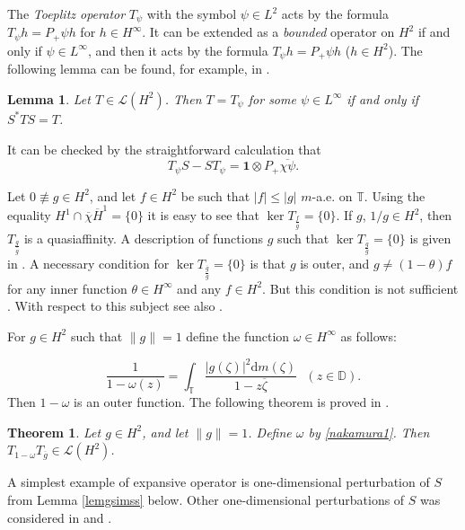 \documentclass[a4paper,oneside,11pt]{amsart}
\numberwithin{equation}{section}
\theoremstyle{plain}
\newtheorem{lemma}[theorem]{Lemma}
\newtheorem{theoremcite}{Theorem}
\theoremstyle{definition}
\begin{document}
The \emph{Toeplitz operator} $T_\psi$ with  the symbol $\psi\in L^2$ acts by the formula 
$T_\psi h=P_+\psi h$ for $h\in H^\infty$. It can be extended as a \emph{bounded} operator on $H^2$   if and only if 
 $\psi\in L^\infty$, and then it acts by the formula $T_\psi h=P_+\psi h$ ($h\in H^2$). 
The following lemma can be found, for example, in {\cite[Theorem 3.1.2]{peller}}.

\begin{lemma}\label{lemcc} Let $T\in\mathcal L(H^2)$. Then $T=T_\psi$ for some $\psi\in L^\infty$ if and only if $S^*TS=T$.
\end{lemma}

 It can be checked by the straightforward calculation that 
\begin{equation}\label{toeplitz} T_\psi S-ST_\psi=\mathbf{1}\otimes P_+\overline{\chi\psi}.
\end{equation}

Let $0\not\equiv g\in H^2$, and let $f\in H^2$ be such that $|f|\leq |g|$ $m$-a.e. on $\mathbb T$. Using the equality $H^1\cap\overline\chi\overline H^1=\{0\}$ it is easy to see that 
$\ker T_{\frac{f}{\overline g}}=\{0\}$. If $g$, $1/g\in H^2$, then $ T_{\frac{g}{\overline g}}$ is a quasiaffinity. 
A description of functions $g$ such that $\ker T_{\frac{\overline g}{g}}=\{0\}$ is given in \cite{sarason89}. 
A necessary condition for $\ker T_{\frac{\overline g}{g}}=\{0\}$ is that $g$ is outer, and $g\neq(1-\theta)f$ for any inner function 
 $\theta\in H^\infty$ and any $f\in H^2$. But this condition is not sufficient \cite{inoue}. With respect to this subject see also \cite{po}.


For $g\in H^2$ such that $\|g\|=1$ define the function $\omega\in H^\infty$ as follows:

\begin{equation}\label{nakamura1} \frac{1}{1-\omega(z)}=\int_{\mathbb T}\frac{|g(\zeta)|^2\mathrm{d}m(\zeta)}{1-z\overline\zeta}
 \ \ \ (z\in\mathbb D).
\end{equation}
Then $1-\omega$ is an outer function. The following theorem is proved in \cite{sarason}. 

\begin{theoremcite}\label{theoremaa}{\cite[Lemma 2]{sarason}} Let $g\in H^2$, and let $\|g\|=1$. Define $\omega$ by 
\eqref{nakamura1}. Then  
$T_{1-\omega} T_{\overline g}\in\mathcal L(H^2)$.
\end{theoremcite}


A simplest example of expansive operator is one-dimensional perturbation of $S$ from Lemma \ref{lemgsimss} below. Other one-dimensional perturbations of $S$  was considered in \cite{nakamura93} and \cite{cassiertimotin}.
\end{document}
